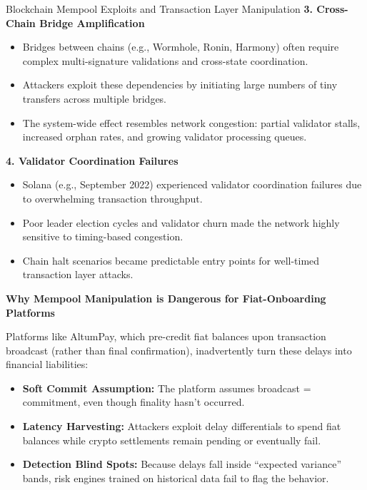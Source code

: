 \begin{HistoricalSidebar}{Blockchain Mempool Exploits and Transaction Layer Manipulation}
    \textbf{3. Cross-Chain Bridge Amplification}
    
    \begin{itemize}
        \item Bridges between chains (e.g., Wormhole, Ronin, Harmony) often require complex multi-signature validations and cross-state coordination.
        \item Attackers exploit these dependencies by initiating large numbers of tiny transfers across multiple bridges.
        \item The system-wide effect resembles network congestion: partial validator stalls, increased orphan rates, and growing validator processing queues.
    \end{itemize}
    
    \textbf{4. Validator Coordination Failures}
    
    \begin{itemize}
        \item Solana (e.g., September 2022) experienced validator coordination failures due to overwhelming transaction throughput.
        \item Poor leader election cycles and validator churn made the network highly sensitive to timing-based congestion.
        \item Chain halt scenarios became predictable entry points for well-timed transaction layer attacks.
    \end{itemize}
    
    \medskip
    
    \textbf{Why Mempool Manipulation is Dangerous for Fiat-Onboarding Platforms}
    
    Platforms like AltumPay, which pre-credit fiat balances upon transaction broadcast (rather than final confirmation), inadvertently turn these delays into financial liabilities:
    
    \begin{itemize}
        \item \textbf{Soft Commit Assumption:} The platform assumes broadcast = commitment, even though finality hasn’t occurred.
        \item \textbf{Latency Harvesting:} Attackers exploit delay differentials to spend fiat balances while crypto settlements remain pending or eventually fail.
        \item \textbf{Detection Blind Spots:} Because delays fall inside “expected variance” bands, risk engines trained on historical data fail to flag the behavior.
    \end{itemize}
    

\end{HistoricalSidebar}
